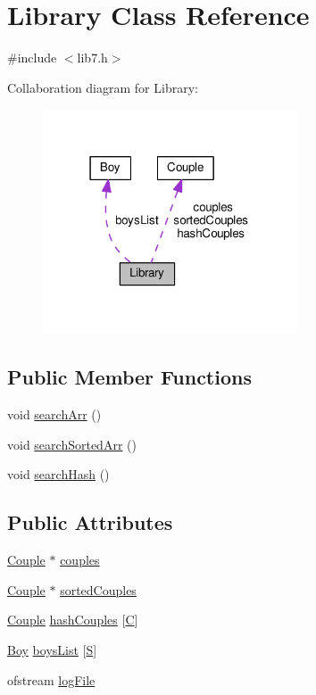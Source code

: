 \hypertarget{classLibrary}{}\section{Library Class Reference}
\label{classLibrary}


{\ttfamily \#include $<$lib7.\+h$>$}



Collaboration diagram for Library\+:
\nopagebreak
\begin{figure}[H]
\begin{center}
\leavevmode
\includegraphics[width=214pt]{classLibrary__coll__graph}
\end{center}
\end{figure}
\subsection*{Public Member Functions}
\begin{DoxyCompactItemize}
\item 
void \hyperlink{classLibrary_af9853cceb7af37b77091c3330b532b2f}{search\+Arr} ()
\item 
void \hyperlink{classLibrary_a835ea2c0b31c569aac4a406843c55254}{search\+Sorted\+Arr} ()
\item 
void \hyperlink{classLibrary_ad14b4301aa6279c13408ff948ca4fd6a}{search\+Hash} ()
\end{DoxyCompactItemize}
\subsection*{Public Attributes}
\begin{DoxyCompactItemize}
\item 
\hyperlink{classCouple}{Couple} $\ast$ \hyperlink{classLibrary_a37cc785266d6a6aeb820499ba875cef1}{couples}
\item 
\hyperlink{classCouple}{Couple} $\ast$ \hyperlink{classLibrary_ac22a9d065ab96fcb3d44e203725e6de6}{sorted\+Couples}
\item 
\hyperlink{classCouple}{Couple} \hyperlink{classLibrary_a81e01bd9f8b2f1fdbc3420b71de2dc49}{hash\+Couples} \mbox{[}\hyperlink{Ques9_8cpp_ac4cf4b2ab929bd23951a8676eeac086b}{C}\mbox{]}
\item 
\hyperlink{classBoy}{Boy} \hyperlink{classLibrary_a28fd1fddb9c961b2cfbb4a054f1ab258}{boys\+List} \mbox{[}\hyperlink{Ques7_8cpp_af933676109efed7ab34cea71d748a517}{S}\mbox{]}
\item 
ofstream \hyperlink{classLibrary_ad8fbb4e17a98e57b3cffe8257710045d}{log\+File}
\end{DoxyCompactItemize}


